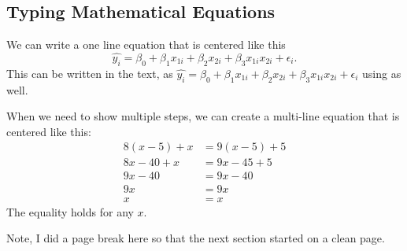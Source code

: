 \documentclass{article}\usepackage[]{graphicx}\usepackage[]{xcolor}
\begin{document}
\begin{multicols}{2}
\subsection{Typing Mathematical Equations}
We can write a one line equation that is centered like this
\[\widehat{y_i} = \beta_0 + \beta_1 x_{1i}+ \beta_2 x_{2i} + \beta_3 x_{1i} x_{2i} + \epsilon_i.\]
This can be written in the text, as $\widehat{y_i} = \beta_0 + \beta_1 x_{1i}+ \beta_2 x_{2i} + \beta_3 x_{1i} x_{2i} + \epsilon_i$ using as well.

When we need to show multiple steps, we can create a multi-line equation that is centered like this:
\begin{align*}
8(x-5) + x &= 9(x-5) + 5\\
8x - 40 + x &= 9x - 45 + 5 \tag{Distributing}\\
9x - 40 &= 9x - 40 \tag{Combining like terms}\\
9x &= 9x \tag{Adding 40 to both sides}\\
x &= x \tag{Dividing both sides by 9}
\end{align*}
The equality holds for any $x$.

Note, I did a page break here so that the next section started on a clean page.
\newpage

\end{multicols}
\end{document}
